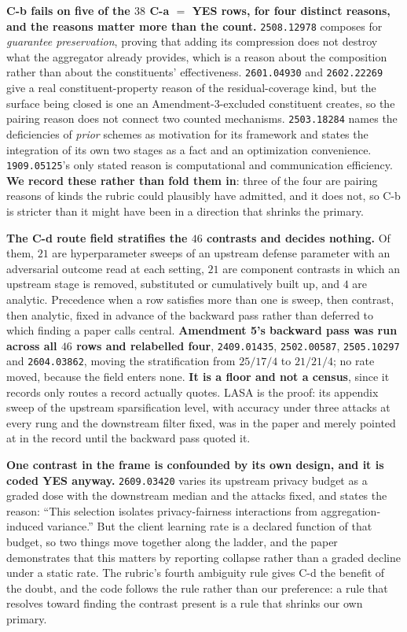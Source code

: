 \documentclass{article}
\begin{document}
\textbf{C-b fails on five of the $38$ C-a $=$ YES rows, for four distinct reasons, and the reasons matter more than the count.} \texttt{2508.12978} composes for \emph{guarantee preservation}, proving that adding its compression does not destroy what the aggregator already provides, which is a reason about the composition rather than about the constituents' effectiveness. \texttt{2601.04930} and \texttt{2602.22269} give a real constituent-property reason of the residual-coverage kind, but the surface being closed is one an Amendment-3-excluded constituent creates, so the pairing reason does not connect two counted mechanisms. \texttt{2503.18284} names the deficiencies of \emph{prior} schemes as motivation for its framework and states the integration of its own two stages as a fact and an optimization convenience. \texttt{1909.05125}'s only stated reason is computational and communication efficiency. \textbf{We record these rather than fold them in}: three of the four are pairing reasons of kinds the rubric could plausibly have admitted, and it does not, so C-b is stricter than it might have been in a direction that shrinks the primary.

\textbf{The C-d route field stratifies the $46$ contrasts and decides nothing.} Of them, $21$ are hyperparameter sweeps of an upstream defense parameter with an adversarial outcome read at each setting, $21$ are component contrasts in which an upstream stage is removed, substituted or cumulatively built up, and $4$ are analytic. Precedence when a row satisfies more than one is sweep, then contrast, then analytic, fixed in advance of the backward pass rather than deferred to which finding a paper calls central. \textbf{Amendment 5's backward pass was run across all $46$ rows and relabelled four}, \texttt{2409.01435}, \texttt{2502.00587}, \texttt{2505.10297} and \texttt{2604.03862}, moving the stratification from $25/17/4$ to $21/21/4$; no rate moved, because the field enters none. \textbf{It is a floor and not a census}, since it records only routes a record actually quotes. LASA is the proof: its appendix sweep of the upstream sparsification level, with accuracy under three attacks at every rung and the downstream filter fixed, was in the paper and merely pointed at in the record until the backward pass quoted it.

\textbf{One contrast in the frame is confounded by its own design, and it is coded YES anyway.} \texttt{2609.03420} varies its upstream privacy budget as a graded dose with the downstream median and the attacks fixed, and states the reason: ``This selection isolates privacy-fairness interactions from aggregation-induced variance.'' But the client learning rate is a declared function of that budget, so two things move together along the ladder, and the paper demonstrates that this matters by reporting collapse rather than a graded decline under a static rate. The rubric's fourth ambiguity rule gives C-d the benefit of the doubt, and the code follows the rule rather than our preference: a rule that resolves toward finding the contrast present is a rule that shrinks our own primary.
\end{document}
